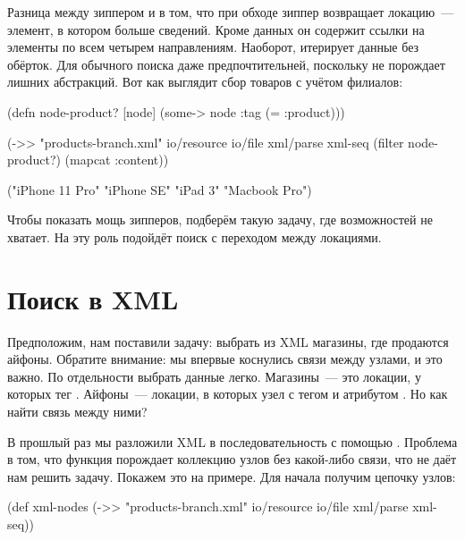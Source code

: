 Разница между зиппером и  в том, что при обходе зиппер возвращает
локацию~--- элемент, в котором больше сведений. Кроме данных он содержит ссылки
на элементы по всем четырем направлениям. Наоборот,  итерирует
данные без обёрток. Для обычного поиска  даже предпочтительней,
поскольку не порождает лишних абстракций. Вот как выглядит сбор товаров с учётом
филиалов:

\pagebreaklarge

\begin{english}
  \begin{clojure}
(defn node-product? [node]
  (some-> node :tag (= :product)))

(->> "products-branch.xml"
     io/resource
     io/file
     xml/parse
     xml-seq
     (filter node-product?)
     (mapcat :content))

("iPhone 11 Pro" "iPhone SE" "iPad 3" "Macbook Pro")
  \end{clojure}
\end{english}

Чтобы показать мощь зипперов, подберём такую задачу, где возможностей 
не хватает. На эту роль подойдёт поиск с переходом между локациями.

\section{Поиск в XML}


Предположим, нам поставили задачу: выбрать из XML магазины, где продаются
айфоны. Обратите внимание: мы впервые коснулись связи между узлами, и это
важно. По отдельности выбрать данные легко. Магазины~--- это локации, у которых
тег . Айфоны~--- локации, в которых узел с тегом  и
атрибутом . Но как найти связь между ними?

В прошлый раз мы разложили XML в последовательность с помощью
. Проблема в том, что функция порождает коллекцию узлов без какой-либо
связи, что не даёт нам решить задачу. Покажем это на примере. Для начала получим
цепочку узлов:

\begin{english}
  \begin{clojure}
(def xml-nodes
  (->> "products-branch.xml"
       io/resource
       io/file
       xml/parse
       xml-seq))
  \end{clojure}
\end{english}

